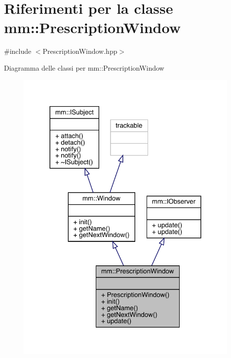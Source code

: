\hypertarget{classmm_1_1_prescription_window}{}\section{Riferimenti per la classe mm\+:\+:Prescription\+Window}
\label{classmm_1_1_prescription_window}


{\ttfamily \#include $<$Prescription\+Window.\+hpp$>$}



Diagramma delle classi per mm\+:\+:Prescription\+Window
\nopagebreak
\begin{figure}[H]
\begin{center}
\leavevmode
\includegraphics[width=309pt]{dc/db0/classmm_1_1_prescription_window__inherit__graph}
\end{center}
\end{figure}


